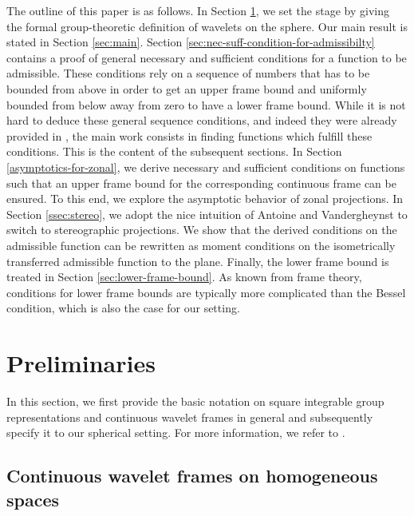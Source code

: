 \documentclass[a4paper,11pt,DIV=11,%
abstract=on%
]{scrartcl}
\newcommand{\blue}[1]{#1}
\begin{document}
The outline of this paper is as follows. 
In Section \ref{sec:preliminaries}, 
we set the stage by giving the formal group-theoretic definition of wavelets on the sphere. 
Our main result is stated in Section \ref{sec:main}.
Section \ref{sec:nec-suff-condition-for-admissibilty} 
contains a proof of general necessary and sufficient conditions for a
function to be admissible. 
These conditions rely on a sequence of numbers
that has to be bounded from above in order to get an upper frame bound and 
uniformly bounded from below away from zero to have a lower frame bound.
While it is not hard to deduce these general sequence conditions, and indeed they were already provided in \cite{AV99}, 
the main work consists in finding functions which fulfill these conditions.
This is the content of the subsequent sections.
In Section \ref{asymptotics-for-zonal}, we derive necessary and sufficient conditions on functions such that an
upper frame bound for the corresponding continuous frame can be ensured.
To this end, we explore the asymptotic behavior of zonal projections.
In Section \ref{ssec:stereo}, we adopt the nice intuition of Antoine and Vandergheynst to
switch to stereographic projections. 
We show that the derived conditions on the admissible function can be rewritten 
as moment conditions on the isometrically transferred
admissible function to the plane.
Finally, the lower frame bound is treated in Section \ref{sec:lower-frame-bound}. 
As known from frame theory, conditions for lower frame bounds are typically 
more complicated than the Bessel condition, which is also the case for our setting.

 
\section{Preliminaries} \label{sec:preliminaries}

In this section, we first provide the basic notation on square integrable group representations and 
continuous wavelet frames in general and subsequently specify it to \blue{our spherical} setting. 
For more information, we refer to \cite{AAG2000,fuhr2005abstract}.

\subsection{Continuous wavelet frames on homogeneous spaces}
\end{document}
